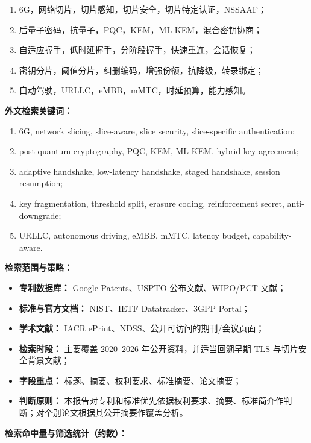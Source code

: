 \documentclass[12pt,a4paper]{article}
\begin{document}
\begin{enumerate}[leftmargin=2em]
    \item 6G，网络切片，切片感知，切片安全，切片特定认证，NSSAAF；
    \item 后量子密码，抗量子，PQC，KEM，ML-KEM，混合密钥协商；
    \item 自适应握手，低时延握手，分阶段握手，快速重连，会话恢复；
    \item 密钥分片，阈值分片，纠删编码，增强份额，抗降级，转录绑定；
    \item 自动驾驶，URLLC，eMBB，mMTC，时延预算，能力感知。
\end{enumerate}

\textbf{外文检索关键词：}

\begin{enumerate}[leftmargin=2em]
    \item 6G, network slicing, slice-aware, slice security, slice-specific authentication;
    \item post-quantum cryptography, PQC, KEM, ML-KEM, hybrid key agreement;
    \item adaptive handshake, low-latency handshake, staged handshake, session resumption;
    \item key fragmentation, threshold split, erasure coding, reinforcement secret, anti-downgrade;
    \item URLLC, autonomous driving, eMBB, mMTC, latency budget, capability-aware.
\end{enumerate}

\textbf{检索范围与策略：}

\begin{itemize}[leftmargin=2em]
    \item \textbf{专利数据库：} Google Patents、USPTO 公布文献、WIPO/PCT 文献；
    \item \textbf{标准与官方文档：} NIST、IETF Datatracker、3GPP Portal；
    \item \textbf{学术文献：} IACR ePrint、NDSS、公开可访问的期刊/会议页面；
    \item \textbf{检索时段：} 主要覆盖 2020--2026 年公开资料，并适当回溯早期 TLS 与切片安全背景文献；
    \item \textbf{字段重点：} 标题、摘要、权利要求、标准摘要、论文摘要；
    \item \textbf{判断原则：} 本报告对专利和标准优先依据权利要求、摘要、标准简介作判断；对个别论文根据其公开摘要作覆盖分析。
\end{itemize}

\vspace{0.5em}
\noindent\textbf{检索命中量与筛选统计（约数）：}
\end{document}
